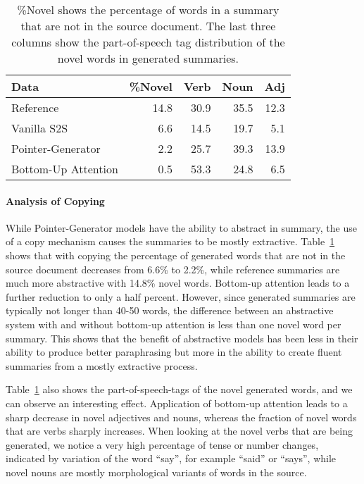 \documentclass[11pt,a4paper]{article}
\begin{document}
\begin{table}[t]
\centering
{}
\begin{tabular}{@{}lrrrr@{}}
\toprule
Data                 & \%Novel &Verb&Noun&Adj\\ \midrule
\small{Reference}            & 14.8 &30.9&35.5&12.3  \\
\small{Vanilla S2S}         & 6.6  &14.5&19.7&5.1   \\
\small{Pointer-Generator}   & 2.2  &25.7&39.3&13.9  \\ 
\small{Bottom-Up Attention} & 0.5  &53.3&24.8&6.5   \\ \bottomrule
\end{tabular}
\caption{\%Novel shows the percentage of words in a summary that are not in the source document. The last three columns show the part-of-speech tag distribution of the novel words in generated summaries.}
\label{tab:copy}
\end{table}


\paragraph{Analysis of Copying}

While Pointer-Generator models have the ability to abstract in summary, the use of a copy mechanism 
causes the summaries to be mostly extractive. Table~\ref{tab:copy} shows that with copying the percentage of generated words that are not in the source document decreases from 6.6\% to 2.2\%, while reference summaries are much more abstractive with 14.8\% novel words. Bottom-up attention leads to a further reduction to only a half percent. However, since generated summaries are typically not longer than 40-50 words, the difference between an abstractive system with and without bottom-up attention is less than one novel word per summary. This shows that the benefit of abstractive models has been less in their ability to produce better paraphrasing but more in the ability to create fluent summaries from a mostly extractive process. 

Table~\ref{tab:copy} also shows the part-of-speech-tags of the novel generated words, and we can observe an interesting effect. Application of bottom-up attention leads to a sharp decrease in novel adjectives and nouns, whereas the fraction of novel words that are verbs sharply increases. When looking at the novel verbs that are being generated, we notice a very high percentage of tense or number changes, indicated by variation of the word ``say'', for example ``said'' or ``says'', while novel nouns are mostly morphological variants of words in the source. 
\end{document}
